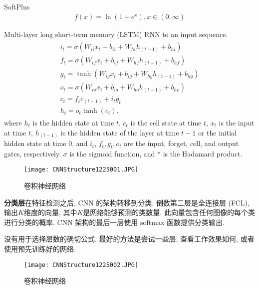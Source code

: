 SoftPlus \cite{glorot2011}
\begin{align}
  f(x)=\ln \left(1+e^{x}\right), x\in (0, \infty)
\end{align}

Multi-layer long short-term memory (LSTM) RNN to an input sequence.
\begin{align}
\begin{array}{l}
{i_{t}=\sigma\left(W_{i i} x_{t}+b_{i i}+W_{h i} h_{(t-1)}+b_{h i}\right)} \\
{f_{t}=\sigma\left(W_{i f} x_{t}+b_{i f}+W_{h f} h_{(t-1)}+b_{h f}\right)} \\
{g_{t}=\tanh \left(W_{i g} x_{t}+b_{i g}+W_{h g} h_{(t-1)}+b_{h g}\right)} \\
{o_{t}=\sigma\left(W_{i o} x_{t}+b_{i o}+W_{h o} h_{(t-1)}+b_{h o}\right)} \\
{c_{t}=f_{t}  c_{(t-1)}+i_{t}  g_{t}} \\
{h_{t}=o_{t}  \tanh \left(c_{t}\right)}.
\end{array}
\end{align}
where $h_t$ is the hidden state at time $t$, $c_t$ is the cell state at time $t$, $x_t$ is the input at time $t$, $h_{(t-1)}$ is the hidden state of the layer at time $t-1$ or the initial hidden state at time 0,
and $i_t$, $f_t, g_t, o_t$ are the input, forget, cell, and output gates, respectively. $\sigma$ is the sigmoid function, and $*$ is the Hadamard product.
\begin{figure}[H]
\centering
\texttt{[image: CNNStructure1225001.JPG]}
\caption{卷积神经网络}
\label{CNNStructure1225001}
\vspace{-0.4cm}
\end{figure}

\textbf{分类层}在特征检测之后, CNN 的架构转移到分类. 倒数第二层是全连接层 (FCL), 输出$K$维度的向量, 其中$K$是网络能够预测的类数量. 此向量包含任何图像的每个类进行分类的概率. CNN 架构的最后一层使用 softmax 函数提供分类输出.

没有用于选择层数的确切公式. 最好的方法是尝试一些层, 查看工作效果如何, 或者使用预先训练好的网络.
\begin{figure}[H]
\centering
\texttt{[image: CNNStructure1225002.JPG]}
\caption{卷积神经网络}
\label{CNNStructure1225002}
\vspace{-0.4cm}
\end{figure}

